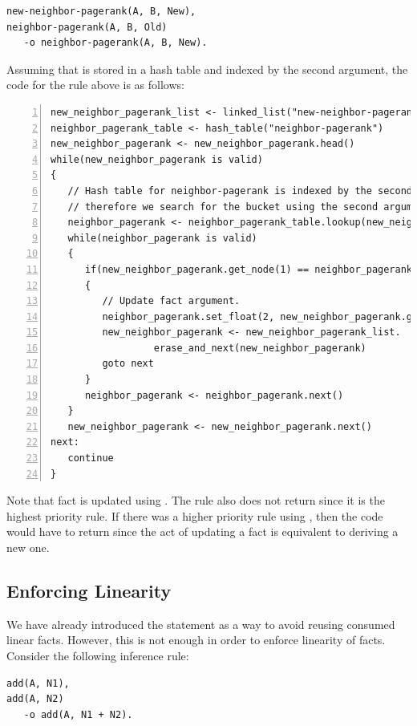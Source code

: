 \begin{Verbatim}[fontsize=\codesize]
new-neighbor-pagerank(A, B, New),
neighbor-pagerank(A, B, Old)
   -o neighbor-pagerank(A, B, New).
\end{Verbatim}

Assuming that  is stored in a hash table and indexed by
the second argument, the code for the rule above is as follows:

\begin{Verbatim}[numbers=left,fontsize=\codesize]
new_neighbor_pagerank_list <- linked_list("new-neighbor-pagerank")
neighbor_pagerank_table <- hash_table("neighbor-pagerank")
new_neighbor_pagerank <- new_neighbor_pagerank.head()
while(new_neighbor_pagerank is valid)
{
   // Hash table for neighbor-pagerank is indexed by the second argument,
   // therefore we search for the bucket using the second argument of new-neighbor-pagerank.
   neighbor_pagerank <- neighbor_pagerank_table.lookup(new_neighbor_pagerank.get_node(1))
   while(neighbor_pagerank is valid)
   {
      if(new_neighbor_pagerank.get_node(1) == neighbor_pagerank.get_node(1))
      {
         // Update fact argument.
         neighbor_pagerank.set_float(2, new_neighbor_pagerank.get_float(2))
         new_neighbor_pagerank <- new_neighbor_pagerank_list.
                  erase_and_next(new_neighbor_pagerank)
         goto next
      }
      neighbor_pagerank <- neighbor_pagerank.next()
   }
   new_neighbor_pagerank <- new_neighbor_pagerank.next()
next:
   continue
}
\end{Verbatim}

Note that  fact is updated using . The
rule also does not return since it is the highest priority rule. If there was a
higher priority rule using , then the code would have to
return since the act of updating a fact is equivalent to deriving a new one.

\subsection{Enforcing Linearity}

We have already introduced the  statement as a way to avoid reusing
consumed linear facts. However, this is not enough in order to enforce
linearity of facts. Consider the following inference rule:

\begin{Verbatim}[fontsize=\codesize]
add(A, N1),
add(A, N2)
   -o add(A, N1 + N2).
\end{Verbatim}

